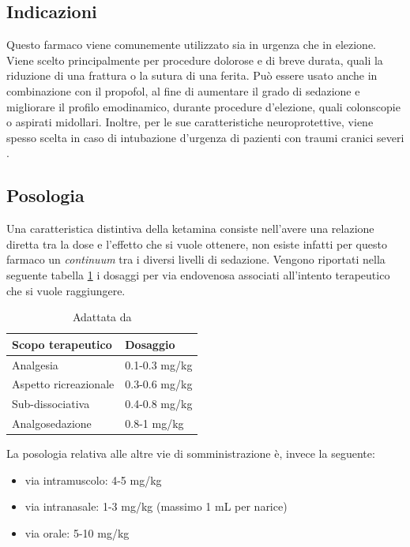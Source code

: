 \subsection*{Indicazioni}

Questo farmaco viene comunemente utilizzato sia in urgenza che in elezione. Viene scelto principalmente per procedure dolorose e di breve durata, quali la riduzione di una frattura o la sutura di una ferita. Può essere usato anche in combinazione con il propofol, al fine di aumentare il grado di sedazione e migliorare il profilo emodinamico, durante procedure d'elezione, quali colonscopie o aspirati midollari. Inoltre, per le sue caratteristiche neuroprotettive, viene spesso scelta in caso di intubazione d'urgenza di pazienti con traumi cranici severi \cite{Simeupsedazione}.

\subsection*{Posologia}

Una caratteristica distintiva della ketamina consiste nell'avere una relazione diretta tra la dose e l'effetto che si vuole ottenere, non esiste infatti per questo farmaco un \emph{continuum} tra i diversi livelli di sedazione. Vengono riportati nella seguente tabella \ref{tab:1} i dosaggi per via endovenosa associati all'intento terapeutico che si vuole raggiungere.


\begin{table}[!h]
    \centering
    \begin{tabular}{|l|l|}
       Scopo terapeutico     & Dosaggio \\ \hline
       Analgesia & 0.1-0.3 mg/kg  \\
       Aspetto ricreazionale & 0.3-0.6 mg/kg \\
       Sub-dissociativa & 0.4-0.8 mg/kg \\
       Analgosedazione & 0.8-1 mg/kg 
    \end{tabular}
    \caption{Adattata da \cite{Simeupsedazione}}
    \label{tab:1}
\end{table}


La posologia relativa alle altre vie di somministrazione è, invece la seguente: 
\begin{itemize}
    \item via intramuscolo: 4-5 mg/kg
    \item via intranasale: 1-3 mg/kg (massimo 1 mL per narice)
    \item via orale: 5-10 mg/kg
\end{itemize}

